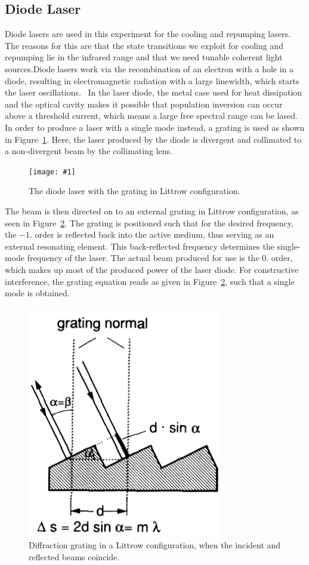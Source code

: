 \documentclass[twocolumn]{article}
\newcommand{\insertFigure}[1]{%
   \texttt{[image: \#1]}%
}
\begin{document}
\subsection{Diode Laser} \label{sec:laser}
Diode lasers are used in this experiment for the cooling and repumping lasers. The reasons for this are that the state transitions we exploit for cooling and repumping lie in the infrared range and that we need tunable coherent light sources.Diode lasers work via the recombination of an electron with a hole in a diode, resulting in electromagnetic radiation with a large linewidth, which starts the laser oscillations.~\cite{demtroder} In the laser diode, the metal case used for heat dissipation and the optical cavity makes it possible that population inversion can occur above a threshold current, which means a large free spectral range can be lased. In order to produce a laser with a single mode instead, a grating is used as shown in Figure~\ref{fig:Diode}. Here, the laser produced by the diode is divergent and collimated to a non-divergent beam by the collimating lens.
\begin{figure} [!h]
	\centering
	\insertFigure{Images/Diode.png}
	\caption{The diode laser with the grating in Littrow configuration.\cite{manual}}
	\label{fig:Diode}
\end{figure}
The beam is then directed on to an external grating in Littrow configuration, as seen in Figure~\ref{fig:Grating}. The grating is positioned such that for the desired frequency, the $-1.$ order is reflected back into the active medium, thus serving as an external resonating element. This back-reflected frequency determines the single-mode frequency of the laser. The actual beam produced for use is the $0.$ order, which makes up most of the produced power of the laser diode. For constructive interference, the grating equation reads as given in Figure~\ref{fig:Grating}, such that a single mode is obtained.
\begin{figure} [!h]
	\centering
	\includegraphics[scale=0.4]{Images/Grating.png}
	\caption{Diffraction grating in a Littrow configuration, when the incident and reflected beams coincide.~\cite{demtroder}}
	\label{fig:Grating}
\end{figure}
\end{document}
